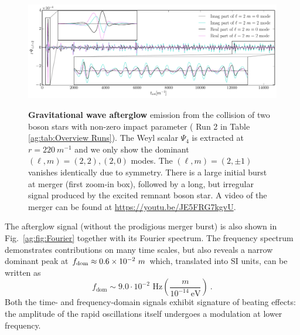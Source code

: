 \begin{figure}[h!]
\begin{center}{
{\includegraphics[width=1.0\columnwidth]{ag_fig/AllModes.pdf}} }
\caption{{\bf Gravitational wave afterglow} emission from the collision of two boson stars with non-zero impact parameter ( Run 2 in Table \ref{ag:tab:Overview Runs}). The Weyl scalar $\Psi_4$ is extracted at $r=220~m^{-1}$ and we only show the dominant $(\ell,m)=(2,2),(2,0)$ modes. The $(\ell,m)=(2,\pm1)$ vanishes identically due to symmetry. There is a large initial burst at merger (first zoom-in box), followed by a long, but irregular signal produced by the excited remnant boson star.  A video of the merger can be found at \url{https://youtu.be/JE5FRG7kgvU}.
 }

\label{ag:fig:GW_signal}
\end{center}
\end{figure}


The afterglow signal (without the prodigious merger burst)
is also shown in Fig.~\ref{ag:fig:Fourier} together with 
its Fourier spectrum. The frequency spectrum demonstrates
contributions on many time scales, but also reveals a
narrow dominant peak at $f_{\rm dom}\approx
0.6\times 10^{-2}~m$ which, translated into SI units, can
be written as
\begin{equation}
    f_{\textrm{dom}} \sim 9.0 \cdot 10^{-2}\text{ Hz} \left( \frac{m}{10^{-14}~\text{eV}}
    \right)~. \label{ag:eqn:freqGW}
\end{equation}
Both the time- and frequency-domain signals exhibit signature
of beating effects: the amplitude of the rapid oscillations
itself undergoes a modulation at lower frequency.



